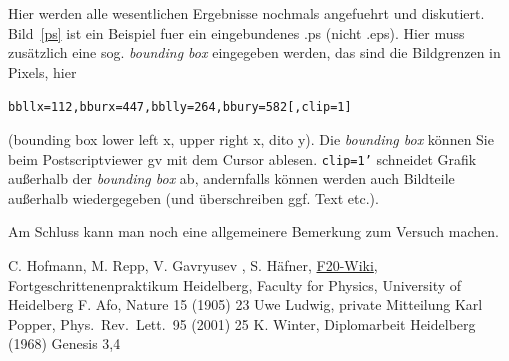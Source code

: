 \documentclass[12pt, a4paper]{article}
\begin{document}
\newpage

































Hier werden alle wesentlichen Ergebnisse nochmals angefuehrt und diskutiert.
Bild~\ref{ps} 
ist ein Beispiel fuer ein eingebundenes .ps (nicht .eps).
Hier muss zus\"atzlich eine sog. {\em bounding box} eingegeben werden, das 
sind die Bildgrenzen in Pixels, hier\\
\centerline{\tt bbllx=112,bburx=447,bblly=264,bbury=582[,clip=1]}
(bounding box lower left x, upper right x, dito y). Die {\it bounding box} 
k\"onnen Sie beim Postscriptviewer gv mit dem Cursor ablesen. {\tt clip=1'}
schneidet Grafik au\ss erhalb der {\it bounding box} ab, andernfalls 
k\"onnen werden auch Bildteile au\ss erhalb wiedergegeben (und \"uberschreiben
ggf. Text etc.).

Am Schluss kann man noch eine allgemeinere Bemerkung zum Versuch machen.


\newpage 


\begin{thebibliography}{00}   %
 C. Hofmann, M. Repp, V. Gavryusev , S. H\"afner, \href{https://www.physi.uni-heidelberg.de/Forschung/QD/f20wikinew/index.php/Main_Page}{F20-Wiki}, Fortgeschrittenenpraktikum Heidelberg, Faculty for Physics, University of Heidelberg
 F. Afo, Nature 15 (1905) 23
 Uwe Ludwig, private Mitteilung
 Karl Popper, Phys.~Rev.~Lett.~95 (2001) 25
 K. Winter, Diplomarbeit Heidelberg (1968)
 Genesis 3,4

\end{thebibliography}
\end{document}
